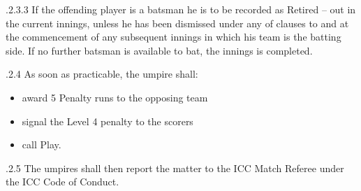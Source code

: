\documentclass[12pt]{article}
\begin{document}
\vspace{\baselineskip}
\begin{adjustwidth}{1.97in}{0.01in}
{\fontsize{9pt}{10.8pt}.2.3.3 \tabto{1.96in} If the offending player is a batsman he is to be recorded as Retired – out in the current innings, unless he has been dismissed under any of clauses to and at the commencement of any subsequent innings in which his team is the batting side. If no further batsman is available to bat, the innings is completed.\par}\par

\end{adjustwidth}


\vspace{\baselineskip}
\begin{adjustwidth}{0.49in}{0.0in}
{\fontsize{9pt}{10.8pt}.2.4 \tabto{1.17in} As soon as practicable, the umpire shall:\par}\par

\end{adjustwidth}


\vspace{\baselineskip}
\begin{itemize}
	\item {\fontsize{9pt}{10.8pt}\selectfont award 5 Penalty runs to the opposing team\par}\par


\vspace{\baselineskip}
	\item {\fontsize{9pt}{10.8pt}\selectfont signal the Level 4 penalty to the scorers\par}\par


\vspace{\baselineskip}
	\item {\fontsize{9pt}{10.8pt}\selectfont call Play.\par}
\end{itemize}\par


\vspace{\baselineskip}
\begin{adjustwidth}{1.18in}{0.36in}
{\fontsize{9pt}{10.8pt}.2.5 \tabto{1.17in} The umpires shall then report the matter to the ICC Match Referee under the ICC Code of Conduct.\par}\par

\end{adjustwidth}
\end{document}
